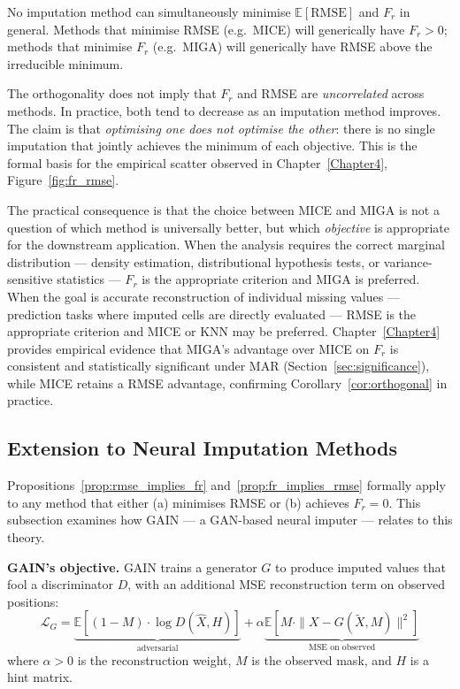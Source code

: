 \begin{corollary}
\label{cor:orthogonal}
No imputation method can simultaneously minimise $\mathbb{E}[\mathrm{RMSE}]$ and $F_r$ in general.
Methods that minimise RMSE (e.g.\ MICE) will generically have $F_r > 0$; methods that minimise $F_r$ (e.g.\ MIGA) will generically have RMSE above the irreducible minimum.
\end{corollary}

\begin{remark}
The orthogonality does not imply that $F_r$ and RMSE are \emph{uncorrelated} across methods.
In practice, both tend to decrease as an imputation method improves.
The claim is that \emph{optimising one does not optimise the other}: there is no single imputation that jointly achieves the minimum of each objective.
This is the formal basis for the empirical scatter observed in Chapter~\ref{Chapter4}, Figure~\ref{fig:fr_rmse}.
\end{remark}

The practical consequence is that the choice between MICE and MIGA is not a question of which method is universally better, but which \emph{objective} is appropriate for the downstream application.
When the analysis requires the correct marginal distribution --- density estimation, distributional hypothesis tests, or variance-sensitive statistics --- $F_r$ is the appropriate criterion and MIGA is preferred.
When the goal is accurate reconstruction of individual missing values --- prediction tasks where imputed cells are directly evaluated --- RMSE is the appropriate criterion and MICE or KNN may be preferred.
Chapter~\ref{Chapter4} provides empirical evidence that MIGA's advantage over MICE on $F_r$ is consistent and statistically significant under MAR (Section~\ref{sec:significance}), while MICE retains a RMSE advantage, confirming Corollary~\ref{cor:orthogonal} in practice.

\subsection{Extension to Neural Imputation Methods}
\label{sec:gain_theory}

Propositions~\ref{prop:rmse_implies_fr} and~\ref{prop:fr_implies_rmse} formally apply to any method that either (a) minimises RMSE or (b) achieves $F_r = 0$. This subsection examines how GAIN \cite{Yoon2018} --- a GAN-based neural imputer --- relates to this theory.

\textbf{GAIN's objective.} GAIN trains a generator $G$ to produce imputed values that fool a discriminator $D$, with an additional MSE reconstruction term on observed positions:
\begin{equation}
    \mathcal{L}_G = \underbrace{\mathbb{E}\left[(1-M)\cdot\log D(\hat{X}, H)\right]}_{\text{adversarial}} + \alpha \underbrace{\mathbb{E}\left[M \cdot \|X - G(\tilde{X}, M)\|^2\right]}_{\text{MSE on observed}}
\end{equation}
where $\alpha > 0$ is the reconstruction weight, $M$ is the observed mask, and $H$ is a hint matrix.

